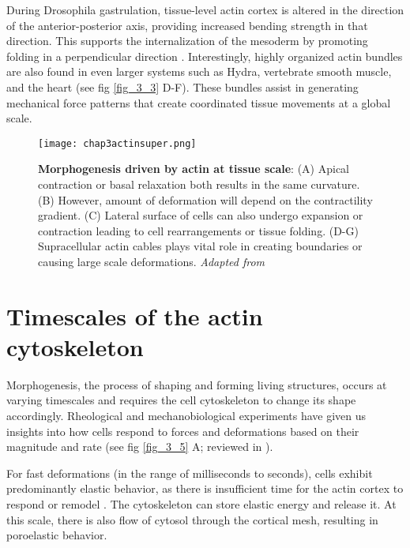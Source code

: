 During Drosophila gastrulation, tissue-level actin cortex is altered in the direction of the anterior-posterior axis, providing increased bending strength in that direction. This supports the internalization of the mesoderm by promoting folding in a perpendicular direction \cite{yevick2019}. Interestingly, highly organized actin bundles are also found in even larger systems such as Hydra, vertebrate smooth muscle, and the heart \cite{maroudas-sacks2021, palmer2021, cetera2014, helm2005} (see fig \ref{fig_3_3} D-F). These bundles assist in generating mechanical force patterns that create coordinated tissue movements at a global scale.


\begin{figure}
	\centering
	\texttt{[image: chap3actinsuper.png]}
	\caption{\label{fig_3_4} \textbf{Morphogenesis driven by actin at tissue scale}: (A) Apical contraction or basal relaxation both results in the same curvature. (B) However, amount of deformation will depend on the contractility gradient. (C) Lateral surface of cells can also undergo expansion or contraction leading to cell rearrangements or tissue folding. (D-G) Supracellular actin cables plays vital role in creating boundaries or causing large scale deformations. \textit{Adapted from \cite{clarke2021}}
	}
\end{figure}

\hypertarget{timescales-of-the-actin-cytoskeleton}{%
	\section{Timescales of the actin
		cytoskeleton}\label{timescales-of-the-actin-cytoskeleton}}

Morphogenesis, the process of shaping and forming living structures, occurs at varying timescales and requires the cell cytoskeleton to change its shape accordingly. Rheological and mechanobiological experiments have given us insights into how cells respond to forces and deformations based on their magnitude and rate (see fig \ref{fig_3_5} A; reviewed in \cite{wyatt2016}).

For fast deformations (in the range of milliseconds to seconds), cells exhibit predominantly elastic behavior, as there is insufficient time for the actin cortex to respond or remodel \cite{deng2006}. The cytoskeleton can store elastic energy and release it. At this scale, there is also flow of cytosol through the cortical mesh, resulting in poroelastic behavior\cite{moeendarbary2013}.

